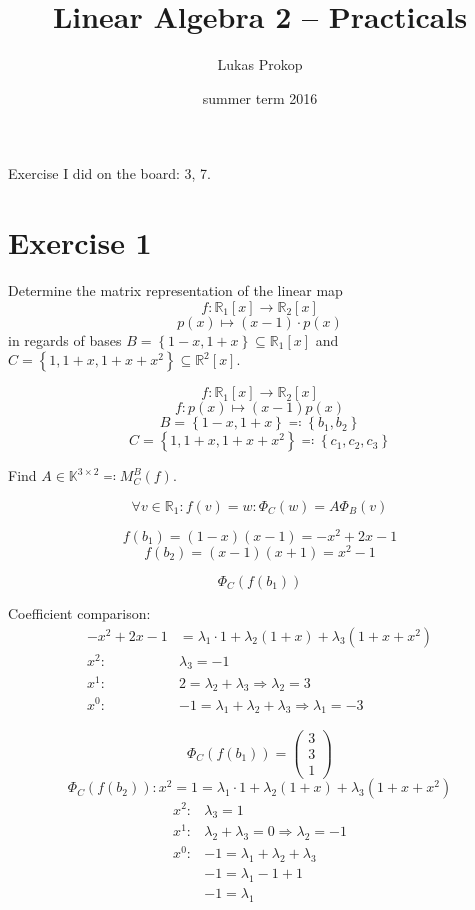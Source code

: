 \documentclass[a4paper]{article}
\title{Linear Algebra 2 -- Practicals}
\author{Lukas Prokop}
\date{summer term 2016}
\theoremstyle{definition}
\newcommand\set[1]{\left\{#1\right\}}
\begin{document}
\maketitle
\tableofcontents

\clearpage
Exercise I did on the board: 3, 7.

\section{Exercise 1}
\begin{ex}
  Determine the matrix representation of the linear map
  \[ f: \mathbb R_1[x] \to \mathbb R_2[x] \]
  \[ p(x) \mapsto (x-1) \cdot p(x) \]
  in regards of bases $B = \set{1-x, 1+x} \subseteq \mathbb R_1[x]$ and $C = \set{1, 1 + x, 1 + x + x^2} \subseteq \mathbb R^2[x]$.
\end{ex}

\[
  f: \mathbb R_1[x] \to \mathbb R_2[x]
\] \[
  f: p(x) \mapsto (x-1) p(x)
\] \[
  B = \set{1-x, 1+x} \eqqcolon \set{b_1, b_2}
\] \[
  C = \set{1, 1+x, 1+x+x^2} \eqqcolon \set{c_1, c_2, c_3}
\]

Find $A \in \mathbb K^{3\times 2} \eqqcolon M_C^B(f)$.

\[ \forall v \in \mathbb R_1: f(v) = w : \Phi_C(w) = A \Phi_B(v) \]

\[ f(b_1) = (1-x)(x-1) = -x^2 + 2x - 1 \]
\[ f(b_2) = (x-1)(x+1) = x^2 - 1 \]

\[ \Phi_C(f(b_1)) \]

Coefficient comparison:
\begin{align*}
  -x^2 + 2x - 1 &= \lambda_1 \cdot 1 + \lambda_2 (1 + x) + \lambda_3 (1 + x + x^2) \\
  x^2: & \lambda_3 = -1 \\
  x^1: & 2 = \lambda_2 + \lambda_3 \Rightarrow \lambda_2 = 3 \\
  x^0: & -1 = \lambda_1 + \lambda_2 + \lambda_3 \Rightarrow \lambda_1 = -3
\end{align*}

\[ \Phi_C(f(b_1)) = \begin{pmatrix} 3 \\ 3 \\ 1 \end{pmatrix} \]
\[ \Phi_C(f(b_2)): x^2 = 1 = \lambda_1 \cdot 1 + \lambda_2 (1 + x) + \lambda_3 (1 + x + x^2) \]
\begin{align*}
  x^2: & \lambda_3 = 1 \\
  x^1: & \lambda_2 + \lambda_3 = 0 \Rightarrow \lambda_2 = -1 \\
  x^0: & -1 = \lambda_1 + \lambda_2 + \lambda_3 \\
       & -1 = \lambda_1 - 1 + 1 \\
       & -1 = \lambda_1
\end{align*}
\end{document}
